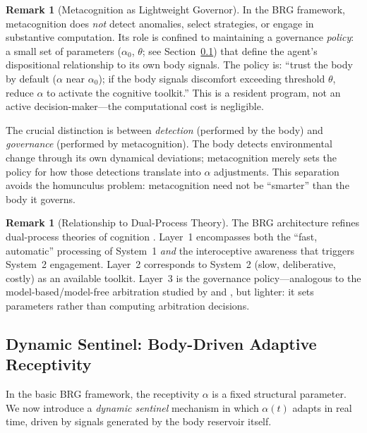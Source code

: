 \documentclass[11pt,a4paper]{article}
\theoremstyle{definition}
\newtheorem{remark}[theorem]{Remark}
\begin{document}
\begin{remark}[Metacognition as Lightweight Governor]
In the BRG framework, metacognition does \emph{not} detect anomalies,
select strategies, or engage in substantive computation.  Its role is
confined to maintaining a governance \emph{policy}: a small set of
parameters ($\alpha_0$, $\theta$; see Section~\ref{sec:dynamic_sentinel})
that define the agent's dispositional relationship to its own body signals.
The policy is: ``trust the body by default ($\alpha$ near $\alpha_0$);
if the body signals discomfort exceeding threshold $\theta$, reduce
$\alpha$ to activate the cognitive toolkit.''  This is a resident program,
not an active decision-maker---the computational cost is negligible.

The crucial distinction is between \emph{detection} (performed by the body)
and \emph{governance} (performed by metacognition).  The body detects
environmental change through its own dynamical deviations; metacognition
merely sets the policy for how those detections translate into $\alpha$
adjustments.  This separation avoids the homunculus problem: metacognition
need not be ``smarter'' than the body it governs.
\end{remark}

\begin{remark}[Relationship to Dual-Process Theory]
The BRG architecture refines dual-process theories of cognition
\citep{kahneman2011}.  Layer~1 encompasses both the ``fast, automatic''
processing of System~1 \emph{and} the interoceptive awareness that
triggers System~2 engagement.  Layer~2 corresponds to System~2 (slow,
deliberative, costly) as an available toolkit.  Layer~3 is the
governance policy---analogous to the model-based/model-free arbitration
studied by \citet{daw2005} and \citet{dolan2013}, but lighter: it sets
parameters rather than computing arbitration decisions.
\end{remark}

\subsection{Dynamic Sentinel: Body-Driven Adaptive Receptivity}
\label{sec:dynamic_sentinel}

In the basic BRG framework, the receptivity $\alpha$ is a fixed structural
parameter.  We now introduce a \emph{dynamic sentinel} mechanism in which
$\alpha(t)$ adapts in real time, driven by signals generated by the body
reservoir itself.
\end{document}
